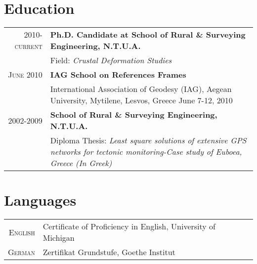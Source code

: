 \documentclass[9pt]{extarticle} %
\begin{document}
\section{Education}
\begin{tabular}{rp{13cm}}
%
  \textsc{2010-current} &\textbf{Ph.D. Candidate at School of Rural \& Surveying Engineering, N.T.U.A.}\\
   & Field: \textit{Crustal Deformation Studies}\\
%
  \textsc{June 2010} & \textbf{IAG School on References Frames}\\
    & International Association of Geodesy \small{(IAG)}, Aegean University, Mytilene, Lesvos, Greece June 7-12, 2010\\
%
  \textsc{2002-2009} & \textbf{School of Rural \& Surveying Engineering, N.T.U.A.}\\
  & Diploma Thesis: 
  \textit{Least square solutions of extensive GPS networks for tectonic monitoring-Case study of Euboea, Greece (In Greek)}\\
%
\end{tabular}
\medskip

\section{Languages}
\begin{tabular}{rp{13cm}}
%
\textsc{English} & Certificate of Proficiency in English, University of Michigan \\
\textsc{German} & Zertifikat Grundstufe, Goethe Institut\\
%
\end{tabular}
\medskip

\end{document}
